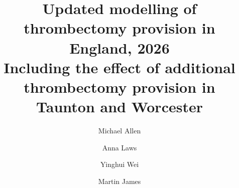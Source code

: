 \title{\textbf{Updated modelling of thrombectomy provision in England, 2026}\\[0.5em]
       \large \textbf{Including the effect of additional thrombectomy provision in Taunton and Worcester}}

\author[1,2]{Michael Allen}
\author[1,2]{Anna Laws}
\author[1,2]{Yinghui Wei}
\author[1,2]{Martin James}


